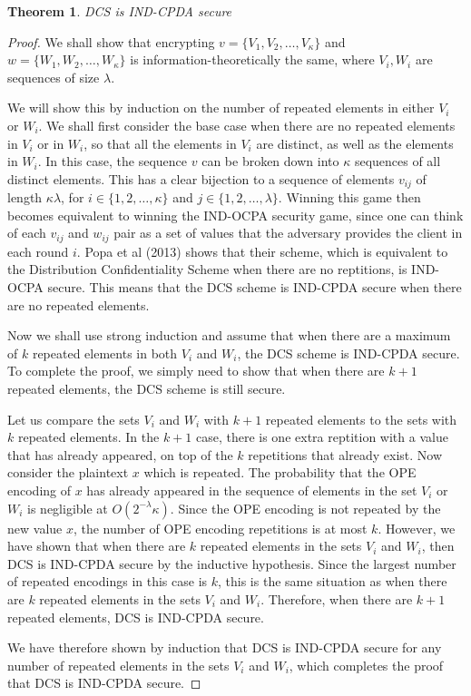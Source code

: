 \documentclass[12pt]{article}
\newtheorem{theorem}{Theorem}[section]
\begin{document}
\begin{theorem}
  DCS is IND-CPDA secure 
\end{theorem}
\begin{proof}
We shall show that encrypting $v = \{V_1, V_2, \ldots, V_{\kappa} \}$ and $w = \{W_1, W_2, \ldots, W_{\kappa}\}$ is information-theoretically the same, where $V_i, W_i$ are sequences of size $\lambda$.

We will show this by induction on the number of repeated elements in either $V_i$ or $W_i$. We shall first consider the base case when there are no repeated elements in $V_i$ or in $W_i$, so that all the elements in $V_i$ are distinct, as well as the elements in $W_i$. In this case, the sequence $v$ can be broken down into $\kappa$ sequences of all distinct elements. This has a clear bijection to a sequence of elements $v_{ij}$ of length $\kappa \lambda$, for $i \in \{1, 2, \ldots, \kappa\}$ and $j \in \{1, 2, \ldots, \lambda \}$. Winning this game then becomes equivalent to winning the IND-OCPA security game, since one can think of each $v_{ij}$ and $w_{ij}$ pair as a set of values that the adversary provides the client in each round $i$. Popa et al (2013) shows that their scheme, which is equivalent to the Distribution Confidentiality Scheme when there are no reptitions, is IND-OCPA secure. This means that the DCS scheme is IND-CPDA secure when there are no repeated elements.

Now we shall use strong induction and assume that when there are a maximum of $k$ repeated elements in both $V_i$ and $W_i$, the DCS scheme is IND-CPDA secure. To complete the proof, we simply need to show that when there are $k+1$ repeated elements, the DCS scheme is still secure.

Let us compare the sets $V_i$ and $W_i$ with $k+1$ repeated elements to the sets with $k$ repeated elements. In the $k+1$ case, there is one extra reptition with a value that has already appeared, on top of the $k$ repetitions that already exist. Now consider the plaintext $x$ which is repeated. The probability that the OPE encoding of $x$ has already appeared in the sequence of elements in the set $V_i$ or $W_i$ is negligible at $O(2^{-\lambda} \kappa)$. Since the OPE encoding is not repeated by the new value $x$, the number of OPE encoding repetitions is at most $k$. However, we have shown that when there are $k$ repeated elements in the sets $V_i$ and $W_i$, then DCS is IND-CPDA secure by the inductive hypothesis. Since the largest number of repeated encodings in this case is $k$, this is the same situation as when there are $k$ repeated elements in the sets $V_i$ and $W_i$. Therefore, when there are $k+1$ repeated elements, DCS is IND-CPDA secure.

We have therefore shown by induction that DCS is IND-CPDA secure for any number of repeated elements in the sets $V_i$ and $W_i$, which completes the proof that DCS is IND-CPDA secure.
\end{proof}
\end{document}

